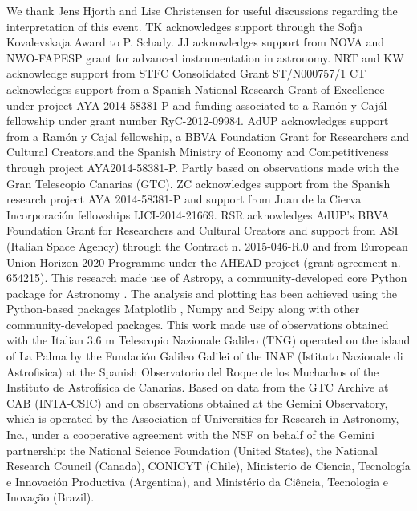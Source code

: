 \documentclass{aa}    %
\begin{document}
\begin{acknowledgements}
We thank Jens Hjorth and Lise Christensen for useful discussions regarding the interpretation of this event. 
%	
TK acknowledges support through the Sofja Kovalevskaja Award to P. Schady.
% 
JJ acknowledges support from NOVA and NWO-FAPESP grant for advanced
instrumentation in astronomy.
%
NRT and KW acknowledge support from STFC Consolidated
Grant ST/N000757/1
%
CT acknowledges support from a Spanish National Research Grant of Excellence
under project AYA 2014-58381-P and funding associated to a Ramón y Cajál
fellowship under grant number RyC-2012-09984.
%
AdUP acknowledges support from a Ramón y Cajal fellowship, a BBVA Foundation
Grant for Researchers and Cultural Creators,and the Spanish Ministry of Economy
and Competitiveness through project AYA2014-58381-P. Partly based on
observations made with the Gran Telescopio Canarias (GTC).
%
ZC acknowledges support from the Spanish research project AYA 2014-58381-P and
support from Juan de la Cierva Incorporaci\'on fellowships IJCI-2014-21669.
%
RSR acknowledges AdUP's BBVA Foundation Grant for Researchers and Cultural
Creators and support from ASI (Italian Space Agency) through the Contract n. 2015-046-R.0 and from European Union Horizon 2020 Programme under the AHEAD project (grant agreement n. 654215).
%
This research made use of Astropy, a community-developed core Python package for Astronomy \citep{TheAstropyCollaboration2013}. The analysis and plotting has been achieved using the Python-based packages Matplotlib \citep{Hunter2007}, Numpy and Scipy \citep{VanderWalt2011} along with other community-developed packages.
%
This work made use of observations obtained with the Italian 3.6 m Telescopio Nazionale Galileo (TNG) operated on the island of La Palma by the Fundaci\'on Galileo Galilei of the INAF (Istituto Nazionale di Astrofisica) at the Spanish Observatorio del Roque de los Muchachos of the Instituto de Astrof\'isica de Canarias.
%
Based on data from the GTC Archive at CAB (INTA-CSIC) and on observations obtained at the Gemini Observatory, which is operated by the Association of Universities for Research in Astronomy, Inc., under a cooperative agreement with the NSF on behalf of the Gemini partnership: the National Science Foundation (United States), the National Research Council (Canada), CONICYT (Chile), Ministerio de Ciencia, Tecnología e Innovación Productiva (Argentina), and Ministério da Ciência, Tecnologia e Inovação (Brazil).

\end{acknowledgements}



\end{document}
